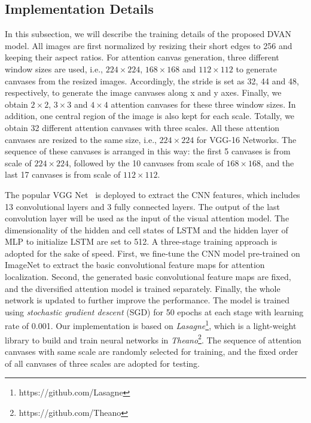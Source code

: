 \documentclass[journal]{IEEEtran}
\begin{document}
\subsection{Implementation Details}
In this subsection, we will describe the training details of the proposed DVAN model.
All images are first normalized by resizing their short edges to 256 and keeping their aspect ratios. For attention canvas generation, three different window sizes are used, i.e., $224\times 224$, $168\times 168$ and $112 \times 112$ to generate canvases from the resized images. Accordingly, the stride is set as 32, 44 and 48, respectively, to generate the image canvases along x and y axes. Finally, we obtain $2 \times 2$, $3 \times 3$ and $4 \times 4$ attention canvases for these three window sizes. In addition, one central region of the image is also kept for each scale. Totally, we obtain 32 different attention canvases with three scales. All these attention canvases are resized to the same size, i.e., $224 \times 224$ for VGG-16 Networks. The sequence of these canvases is arranged in this way: the first 5 canvases is from scale of $224 \times 224$, followed by the 10 canvases from scale of $168 \times 168$, and the last 17 canvases is from scale of $112 \times 112$.

The popular VGG Net~\cite{Simonyan:2014ws} is deployed to extract the CNN features, which includes 13 convolutional layers and 3 fully connected layers. The output of the last convolution layer will be used as the input of the visual attention model. The dimensionality of the hidden and cell states of LSTM and the hidden layer of MLP to initialize LSTM are set to 512. A three-stage training approach is adopted for the sake of speed. First, we fine-tune the CNN model pre-trained on ImageNet to extract the basic convolutional feature maps for attention localization. Second, the generated basic convolutional feature maps are fixed, and the diversified attention model is trained separately. Finally, the whole network is updated to further improve the performance. The model is trained using \emph{stochastic gradient descent} (SGD) for 50 epochs at each stage with learning rate of 0.001. Our implementation is based on \emph{Lasagne}\footnote{https://github.com/Lasagne}, which is a light-weight library to build and train neural networks in \emph{Theano}\footnote{https://github.com/Theano}. The sequence of attention canvases with same scale are randomly selected for training, and the fixed order of all canvases of three scales are adopted for testing.
\end{document}
